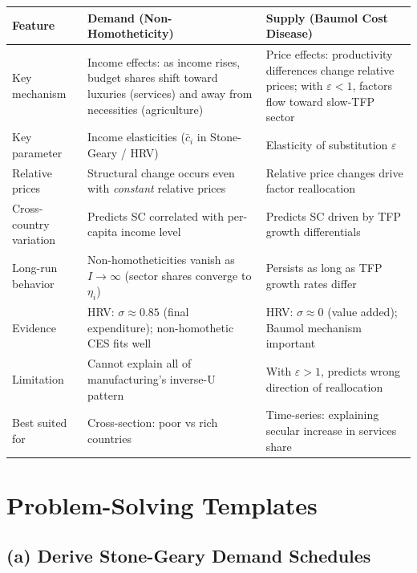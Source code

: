 \documentclass[a4paper,11pt]{article}
\begin{document}
\begin{center}
\begin{tabular}{p{3.5cm}p{5.5cm}p{5.5cm}}
\toprule
\textbf{Feature} & \textbf{Demand (Non-Homotheticity)} & \textbf{Supply (Baumol Cost Disease)} \\
\midrule
Key mechanism & Income effects: as income rises, budget shares shift toward luxuries (services) and away from necessities (agriculture) & Price effects: productivity differences change relative prices; with $\varepsilon < 1$, factors flow toward slow-TFP sector \\
Key parameter & Income elasticities ($\bar{c}_i$ in Stone-Geary / HRV) & Elasticity of substitution $\varepsilon$ \\
Relative prices & Structural change occurs even with \emph{constant} relative prices & Relative price changes drive factor reallocation \\
Cross-country variation & Predicts SC correlated with per-capita income level & Predicts SC driven by TFP growth differentials \\
Long-run behavior & Non-homotheticities vanish as $I \to \infty$ (sector shares converge to $\eta_i$) & Persists as long as TFP growth rates differ \\
Evidence & HRV: $\sigma \approx 0.85$ (final expenditure); non-homothetic CES fits well & HRV: $\sigma \approx 0$ (value added); Baumol mechanism important \\
Limitation & Cannot explain all of manufacturing's inverse-U pattern & With $\varepsilon > 1$, predicts wrong direction of reallocation \\
Best suited for & Cross-section: poor vs rich countries & Time-series: explaining secular increase in services share \\
\bottomrule
\end{tabular}
\end{center}

\clearpage

\section{Problem-Solving Templates}

\subsection*{(a) Derive Stone-Geary Demand Schedules}
\end{document}
